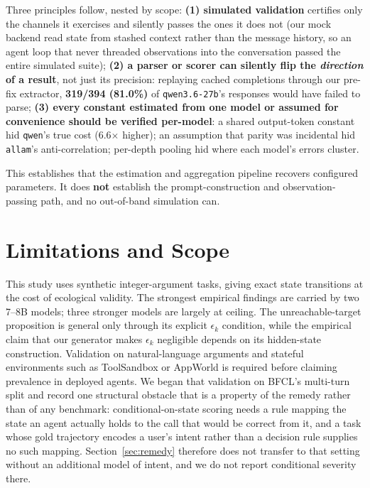 \documentclass{article}
\begin{document}
Three principles follow, nested by scope: \textbf{(1) simulated validation} certifies only the channels it exercises and silently passes the ones it does not (our mock backend read state from stashed context rather than the message history, so an agent loop that never threaded observations into the conversation passed the entire simulated suite); \textbf{(2) a parser or scorer can silently flip the \emph{direction} of a result}, not just its precision: replaying cached completions through our pre-fix extractor, \textbf{319/394 (81.0\%)} of \texttt{qwen3.6-27b}'s responses would have failed to parse; \textbf{(3) every constant estimated from one model or assumed for convenience should be verified per-model}: a shared output-token constant hid \texttt{qwen}'s true cost (6.6$\times$ higher); an assumption that parity was incidental hid \texttt{allam}'s anti-correlation; per-depth pooling hid where each model's errors cluster.

This establishes that the estimation and aggregation pipeline recovers configured parameters. It does \textbf{not} establish the prompt-construction and observation-passing path, and no out-of-band simulation can.

\section{Limitations and Scope}
\label{sec:limitations}

This study uses synthetic integer-argument tasks, giving exact state transitions at the cost of ecological validity. The strongest empirical findings are carried by two 7--8B models; three stronger models are largely at ceiling. The unreachable-target proposition is general only through its explicit $\epsilon_k$ condition, while the empirical claim that our generator makes $\epsilon_k$ negligible depends on its hidden-state construction. Validation on natural-language arguments and stateful environments such as ToolSandbox or AppWorld is required before claiming prevalence in deployed agents. We began that validation on BFCL's multi-turn split and record one structural obstacle that is a property of the remedy rather than of any benchmark: conditional-on-state scoring needs a rule mapping the state an agent actually holds to the call that would be correct from it, and a task whose gold trajectory encodes a user's intent rather than a decision rule supplies no such mapping. Section~\ref{sec:remedy} therefore does not transfer to that setting without an additional model of intent, and we do not report conditional severity there.
\end{document}
